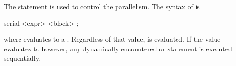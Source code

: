 The  statement is used to control the parallelism.
The syntax of  is
\begin{chapel}
serial <expr> <block> ;
\end{chapel}
where  evaluates to a .  Regardless of that
value,  is evaluated. If the value evaluates to
 however, any dynamically encountered  or
 statement is executed sequentially. 

